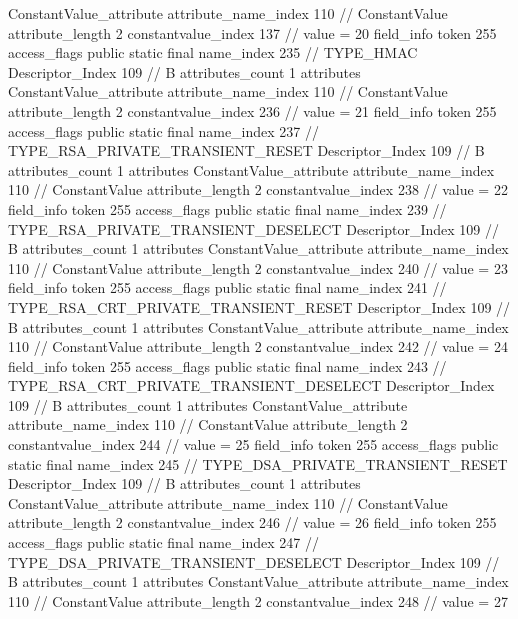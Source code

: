 {{{{{{				ConstantValue_attribute {
					attribute_name_index	110		// ConstantValue
					attribute_length	2
					constantvalue_index	137		// value = 20
				}
				}
			}
			field_info {
				token	255
				access_flags	public static final
				name_index	235		// TYPE_HMAC
				Descriptor_Index	109		// B
				attributes_count	1
				attributes {
				ConstantValue_attribute {
					attribute_name_index	110		// ConstantValue
					attribute_length	2
					constantvalue_index	236		// value = 21
				}
				}
			}
			field_info {
				token	255
				access_flags	public static final
				name_index	237		// TYPE_RSA_PRIVATE_TRANSIENT_RESET
				Descriptor_Index	109		// B
				attributes_count	1
				attributes {
				ConstantValue_attribute {
					attribute_name_index	110		// ConstantValue
					attribute_length	2
					constantvalue_index	238		// value = 22
				}
				}
			}
			field_info {
				token	255
				access_flags	public static final
				name_index	239		// TYPE_RSA_PRIVATE_TRANSIENT_DESELECT
				Descriptor_Index	109		// B
				attributes_count	1
				attributes {
				ConstantValue_attribute {
					attribute_name_index	110		// ConstantValue
					attribute_length	2
					constantvalue_index	240		// value = 23
				}
				}
			}
			field_info {
				token	255
				access_flags	public static final
				name_index	241		// TYPE_RSA_CRT_PRIVATE_TRANSIENT_RESET
				Descriptor_Index	109		// B
				attributes_count	1
				attributes {
				ConstantValue_attribute {
					attribute_name_index	110		// ConstantValue
					attribute_length	2
					constantvalue_index	242		// value = 24
				}
				}
			}
			field_info {
				token	255
				access_flags	public static final
				name_index	243		// TYPE_RSA_CRT_PRIVATE_TRANSIENT_DESELECT
				Descriptor_Index	109		// B
				attributes_count	1
				attributes {
				ConstantValue_attribute {
					attribute_name_index	110		// ConstantValue
					attribute_length	2
					constantvalue_index	244		// value = 25
				}
				}
			}
			field_info {
				token	255
				access_flags	public static final
				name_index	245		// TYPE_DSA_PRIVATE_TRANSIENT_RESET
				Descriptor_Index	109		// B
				attributes_count	1
				attributes {
				ConstantValue_attribute {
					attribute_name_index	110		// ConstantValue
					attribute_length	2
					constantvalue_index	246		// value = 26
				}
				}
			}
			field_info {
				token	255
				access_flags	public static final
				name_index	247		// TYPE_DSA_PRIVATE_TRANSIENT_DESELECT
				Descriptor_Index	109		// B
				attributes_count	1
				attributes {
				ConstantValue_attribute {
					attribute_name_index	110		// ConstantValue
					attribute_length	2
					constantvalue_index	248		// value = 27
}}}}}}}
